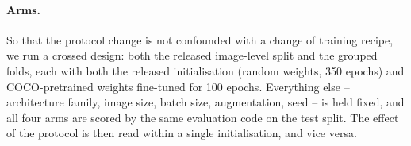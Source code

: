 \paragraph{Arms.} So that the protocol change is not confounded with a change of training
recipe, we run a crossed design: both the released image-level split and the grouped folds,
each with both the released initialisation (random weights, 350 epochs) and COCO-pretrained
weights fine-tuned for 100 epochs. Everything else -- architecture family, image size, batch
size, augmentation, seed -- is held fixed, and all four arms are scored by the same
evaluation code on the test split. The effect of the protocol is then read within a single
initialisation, and vice versa.
